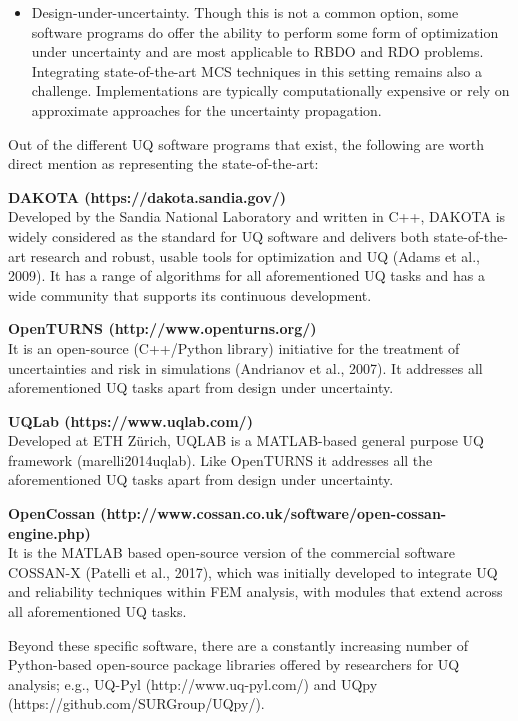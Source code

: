 \begin{itemize}
    \item Design-under-uncertainty. Though this is not a common option, some software programs do offer the ability to perform some form of optimization under uncertainty and are most applicable to RBDO and RDO problems. Integrating state-of-the-art MCS techniques in this setting remains also a challenge. Implementations are typically computationally expensive or rely on approximate approaches for the uncertainty propagation.
\end{itemize}

\noindent Out of the different UQ software programs that exist, the following are worth direct mention as representing the state-of-the-art: 
\newline

\noindent\textbf{DAKOTA (https://dakota.sandia.gov/)} \\Developed by the Sandia National Laboratory and written in C++, DAKOTA is widely considered as the standard for UQ software and delivers both state-of-the-art research and robust, usable tools for optimization and UQ (Adams et al., 2009). It has a range of algorithms for all aforementioned UQ tasks and has a wide community that supports its continuous development. 
\newline

\noindent\textbf{OpenTURNS (http://www.openturns.org/)} \\It is an open-source (C++/Python library) initiative for the treatment of uncertainties and risk in simulations (Andrianov et al., 2007). It addresses all aforementioned UQ tasks apart from design under uncertainty. 
\newline

\noindent\textbf{UQLab (https://www.uqlab.com/)} \\Developed at ETH Zürich, UQLAB is a MATLAB-based general purpose UQ framework (marelli2014uqlab). Like OpenTURNS it addresses all the aforementioned UQ tasks apart from design under uncertainty. 
\newline

\noindent\textbf{OpenCossan (http://www.cossan.co.uk/software/open-cossan-engine.php)} \\It is the MATLAB based open-source version of the commercial software COSSAN-X (Patelli et al., 2017), which was initially developed to integrate UQ and reliability techniques within FEM analysis, with modules that extend across all aforementioned UQ tasks.

Beyond these specific software, there are a constantly increasing number of Python-based open-source package libraries offered by researchers for UQ analysis; e.g., UQ-Pyl (http://www.uq-pyl.com/) and UQpy (https://github.com/SURGroup/UQpy/).
